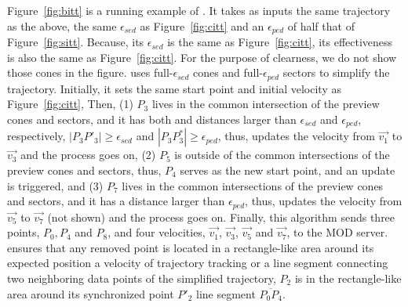 \begin{example}
	Figure~\ref{fig:bitt} is a running example of \bitt. It takes as inputs the same trajectory as the above, the same $\epsilon_{sed}$ as Figure~\ref{fig:citt} and an $\epsilon_{ped}$ of half that of Figure~\ref{fig:sitt}. Because, its $\epsilon_{sed}$ is the same as Figure~\ref{fig:citt}, its effectiveness is also the same as Figure~\ref{fig:citt}. For the purpose of clearness, we do not show those cones in the figure.
	\bitt uses full-$\epsilon_{sed}$ cones and full-$\epsilon_{ped}$ sectors to simplify the trajectory. Initially, it sets the same start point and initial velocity as Figure~\ref{fig:citt}, 
	Then, (1) $P_3$ lives in the common intersection of the preview cones and sectors, and it has both \sed and \ped distances larger than $\epsilon_{sed}$ and $\epsilon_{ped}$, respectively, \ie $|P_3P'_3| \ge \epsilon_{sed}$ and $|P_3P^*_3| \ge \epsilon_{ped}$, thus, \bitt updates the velocity from $\vec{v_1}$ to $\vec{v_3}$ and the process goes on, (2) $P_5$ is outside of the common intersections of the preview cones and sectors, thus, $P_4$ serves as the new start point, and an update is triggered, and (3) $P_7$ lives in the common intersections of the preview cones and sectors, and it has a \ped distance larger than $\epsilon_{ped}$, thus, \bitt updates the velocity from $\vec{v_5}$ to $\vec{v_7}$ (not shown) and the process goes on. Finally, this algorithm sends three points, $P_0, P_4$ and $P_8$, and four velocities, $\vec{v_1}$, $\vec{v_3}$, $\vec{v_5}$ and $\vec{v_7}$, to the MOD server. 
	\bitt ensures that any removed point is located in a rectangle-like area around its expected position \wrt a velocity of trajectory tracking or a line segment connecting two neighboring data points of the simplified trajectory, \eg $P_2$ is in the rectangle-like area around its synchronized point $P'_2$ \wrt line segment $\overline{P_0P_4}$. 
\end{example}

